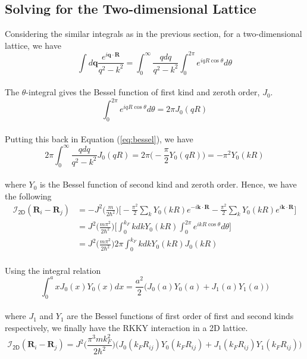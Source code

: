 \documentclass{article}
\begin{document}
\subsection{Solving for the Two-dimensional Lattice}
Considering the similar integrals as in the previous section, for a two-dimensional lattice, we have
\\
\begin{equation}\label{eq:bessel}
\int d\textbf{q} \frac{e^{i \textbf{q} \cdot \textbf{R}}}{q^2 - k^2} =  \int_{0}^{\infty}\frac{q dq}{q^2-k^2} \int_{0}^{2\pi}e^{iqR \cos\theta}d\theta 
\end{equation} 
\\
The $\theta$-integral gives the Bessel function of first kind and zeroth order, $J_0$. 
\begin{equation}
\int_{0}^{2\pi}e^{iqR \cos\theta}d\theta = 2\pi J_0(qR)
\end{equation}
\\
Putting this back in Equation (\ref{eq:bessel}), we have
\\
\begin{equation}
2\pi\int_{0}^{\infty}\frac{q dq}{q^2-k^2} J_0(qR) = 2\pi \Big( -\frac{\pi}{2} Y_0(qR) \Big) = -\pi^2 Y_0(kR)
\end{equation}
\\
where  $Y_0$ is the Bessel function of second kind and zeroth order. Hence, we have the following
\\
\begin{equation}
\begin{split}
\mathcal{I}_{\textsf{2D}}(\textbf{R}_i - \textbf{R}_j) &= -J^2 \Bigg(\frac{m}{2\hbar^2}\Bigg)\Big[-\frac{\pi^2}{2}\sum_{k}Y_0(kR)e^{-i\textbf{k} \cdot \textbf{R}}    -\frac{\pi^2}{2} \sum_{k}Y_0(kR)e^{i\textbf{k} \cdot \textbf{R}}  \Big]\\
&= J^2 \Bigg(\frac{m\pi^2}{2\hbar^2}\Bigg)\Bigg[\int_{0}^{k_F}k dk Y_0(kR) \int_{0}^{2\pi}e^{ikR \cos\theta}d\theta \Bigg]\\
&= J^2 \Bigg(\frac{m\pi^2}{2\hbar^2}\Bigg) 2\pi \int_{0}^{k_F}k dk Y_0(kR)J_0(kR)
\end{split}
\end{equation}
\\
Using the integral relation 
\\
\begin{equation}
\int_{0}^{a} x  J_0(x) Y_0(x)dx = \frac{a^2}{2}\Big(J_0(a) Y_0(a) +  J_1(a) Y_1(a)  \Big)
\end{equation}
\\
where $J_1$ and $Y_1$ are the Bessel functions of first order of first and second kinds respectively, we finally have the RKKY interaction in a 2D lattice.
\\
\begin{equation}
\mathcal{I}_{\textsf{2D}}(\textbf{R}_i - \textbf{R}_j) = J^2 \Bigg(\frac{ \pi^3mk_F^2}{2\hbar^2 }\Bigg)\Big(J_0(k_F R_{ij}) Y_0(k_F R_{ij}) +  J_1(k_F R_{ij}) Y_1(k_F R_{ij}) \Big)
\end{equation}
\end{document}
